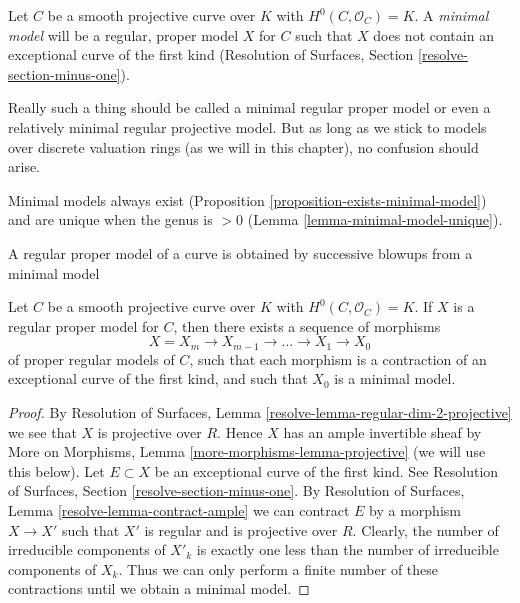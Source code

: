 \begin{definition}
\label{definition-minimal-model}
Let $C$ be a smooth projective curve over $K$ with
$H^0(C, \mathcal{O}_C) = K$. A {\it minimal model}
will be a regular, proper model $X$ for $C$ such that
$X$ does not contain an exceptional curve of the first kind
(Resolution of Surfaces, Section \ref{resolve-section-minus-one}).
\end{definition}

\noindent
Really such a thing should be called a minimal regular proper model
or even a relatively minimal regular projective model. But as long
as we stick to models over discrete valuation rings (as we will
in this chapter), no confusion should arise.

\medskip\noindent
Minimal models always exist
(Proposition \ref{proposition-exists-minimal-model}) and are unique
when the genus is $> 0$ (Lemma \ref{lemma-minimal-model-unique}).

\begin{lemma}
\label{lemma-pre-exists-minimal-model}
\begin{slogan}
A regular proper model of a curve is obtained by successive blowups
from a minimal model
\end{slogan}
Let $C$ be a smooth projective curve over $K$ with
$H^0(C, \mathcal{O}_C) = K$. If $X$ is a regular proper
model for $C$, then there exists a sequence of morphisms
$$
X = X_m \to X_{m - 1} \to \ldots \to X_1 \to X_0
$$
of proper regular models of $C$, such that each morphism is a
contraction of an exceptional curve of the first kind, and such
that $X_0$ is a minimal model.
\end{lemma}

\begin{proof}
By Resolution of Surfaces, Lemma \ref{resolve-lemma-regular-dim-2-projective}
we see that $X$ is projective over $R$. Hence $X$ has an ample
invertible sheaf by
More on Morphisms, Lemma \ref{more-morphisms-lemma-projective}
(we will use this below).
Let $E \subset X$ be an exceptional curve of the first kind.
See Resolution of Surfaces, Section \ref{resolve-section-minus-one}.
By Resolution of Surfaces, Lemma \ref{resolve-lemma-contract-ample}
we can contract $E$ by a morphism $X \to X'$ such that $X'$ is
regular and is projective over $R$. Clearly, the number of
irreducible components of $X'_k$ is exactly one less than the
number of irreducible components of $X_k$. Thus we can only
perform a finite number of these contractions until we
obtain a minimal model.
\end{proof}

